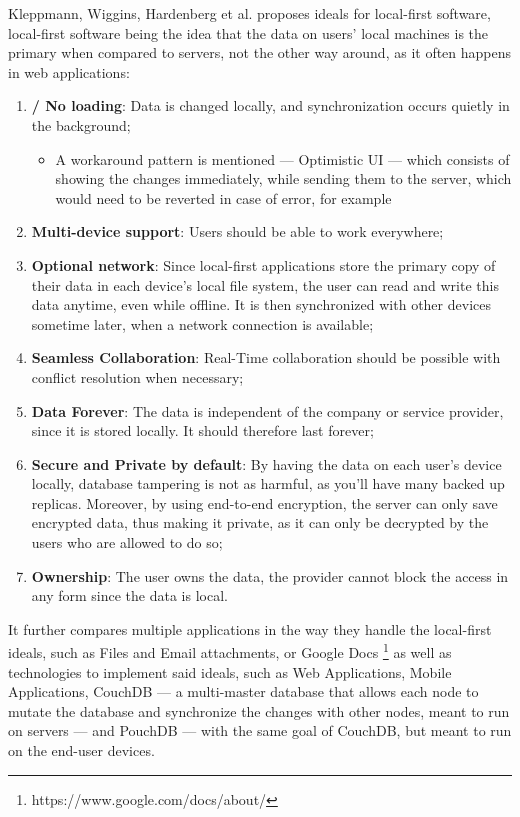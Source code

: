 Kleppmann, Wiggins, Hardenberg et al. \cite{Kleppmann2019} proposes ideals for local-first software, local-first software being the idea that the data on users' local machines is the primary when compared to servers, not the other way around, as it often happens in web applications:

\begin{enumerate}
    \item \textbf{ / No loading}: Data is changed locally, and synchronization occurs quietly in the background;
    \begin{itemize}
        \item A workaround pattern is mentioned --- Optimistic UI --- which consists of showing the changes immediately, while sending them to the server, which would need to be reverted in case of error, for example
    \end{itemize}
    \item \textbf{Multi-device support}: Users should be able to work everywhere;
    \item \textbf{Optional network}: Since local-first applications store the primary copy of their data in each device’s local file system, the user can read and write this data anytime, even while offline. It is then synchronized with other devices sometime later, when a network connection is available;
    \item \textbf{Seamless Collaboration}: Real-Time collaboration should be possible with conflict resolution when necessary;
    \item \textbf{Data Forever}: The data is independent of the company or service provider, since it is stored locally. It should therefore last forever;
    \item \textbf{Secure and Private by default}: By having the data on each user's device locally, database tampering is not as harmful, as you'll have many backed up replicas. Moreover, by using end-to-end encryption, the server can only save encrypted data, thus making it private, as it can only be decrypted by the users who are allowed to do so;
    \item \textbf{Ownership}: The user owns the data, the provider cannot block the access in any form since the data is local.
\end{enumerate}

It further compares multiple applications in the way they handle the local-first ideals, such as Files and Email attachments, or Google Docs \footnote{https://www.google.com/docs/about/} as well as technologies to implement said ideals, such as Web Applications, Mobile Applications, CouchDB \cite{couchdb} --- a multi-master database that allows each node to mutate the database and synchronize the changes with other nodes, meant to run on servers --- and PouchDB \cite{pouchdb} --- with the same goal of CouchDB, but meant to run on the end-user devices.

